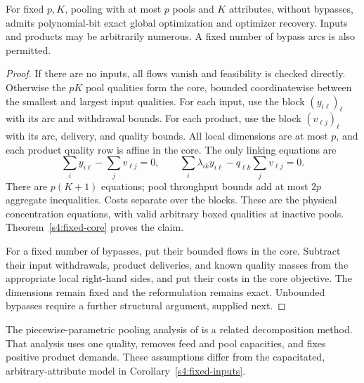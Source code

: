 \begin{corollary}
\label{s4:fixed-qualities}
For fixed $p,K$, pooling with at most $p$ pools and $K$ attributes,
without bypasses, admits polynomial-bit exact global optimization and
optimizer recovery. Inputs and products may be arbitrarily numerous.
A fixed number of bypass arcs is also permitted.
\end{corollary}
\begin{proof}
If there are no inputs, all flows vanish and feasibility is checked
directly. Otherwise the $pK$ pool qualities form the core, bounded
coordinatewise between the smallest and largest input qualities.
For each input, use the block $(y_{i\ell})_\ell$ with its arc and
withdrawal bounds. For each product, use the block $(v_{\ell j})_\ell$
with its arc, delivery, and quality bounds. All local dimensions are
at most $p$, and each product quality row is affine in the core.
The only linking equations are
\begin{equation}
 \sum_i y_{i\ell}-\sum_jv_{\ell j}=0,\qquad
 \sum_i\lambda_{ik}y_{i\ell}-q_{\ell k}\sum_jv_{\ell j}=0.
 \label{s4:no-bypass-balances}
\end{equation}
There are $p(K+1)$ equations; pool throughput bounds add at most $2p$
aggregate inequalities. Costs separate over the blocks. These are the
physical concentration equations, with valid arbitrary boxed qualities
at inactive pools. Theorem~\ref{s4:fixed-core} proves the claim.

For a fixed number of bypasses, put their bounded flows in the core.
Subtract their input withdrawals, product deliveries, and known quality
masses from the appropriate local right-hand sides, and put their
costs in the core objective. The dimensions remain fixed and the
reformulation remains exact. Unbounded bypasses require a further
structural argument, supplied next.
\end{proof}

The piecewise-parametric pooling analysis of
\citet[Assumption~2.2]{s3:baltean2018} is a related decomposition
method. That analysis uses one quality, removes feed and pool
capacities, and fixes positive product demands. These assumptions
differ from the capacitated, arbitrary-attribute model in
Corollary~\ref{s4:fixed-inputs}.

